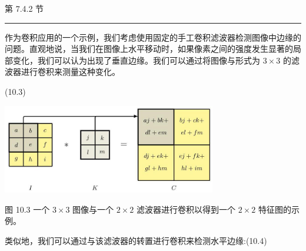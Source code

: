\documentclass[10pt]{article}
\newcommand{\HRule}{\begin{center}\rule{0.9\linewidth}{0.2mm}\end{center}}
\begin{document}
第 7.4.2 节

\HRule

作为卷积应用的一个示例，我们考虑使用固定的手工卷积滤波器检测图像中边缘的问题。直观地说，当我们在图像上水平移动时，如果像素之间的强度发生显著的局部变化，我们可以认为出现了垂直边缘。我们可以通过将图像与形式为 \(3 \times  3\) 的滤波器进行卷积来测量这种变化。

\begin{center}
\end{center}

(10.3)

\begin{center}
\includegraphics[max width=0.7\textwidth]{images/0194e279-9b28-703a-88f4-c3ac21e2010d_312_543_346_918_384_0.jpg}
\end{center}
\hspace*{3em} 

图 10.3 一个 \(3 \times  3\) 图像与一个 \(2 \times  2\) 滤波器进行卷积以得到一个 \(2 \times  2\) 特征图的示例。

类似地，我们可以通过与该滤波器的转置进行卷积来检测水平边缘:(10.4)

\begin{center}
\end{center}
\end{document}
